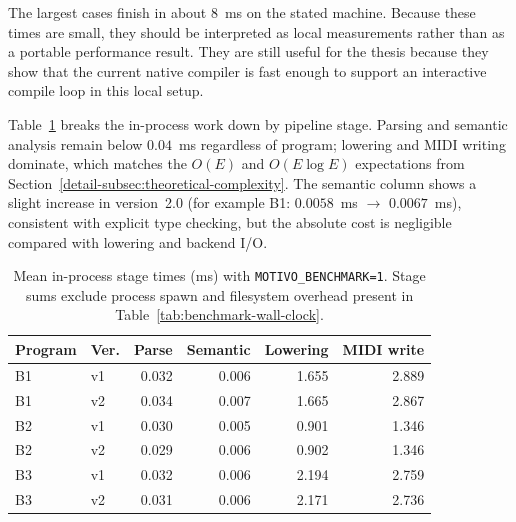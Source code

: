 The largest cases finish in about 8~ms on the stated machine.
Because these times are small, they should be interpreted as local measurements rather than as a portable performance
result.
They are still useful for the thesis because they show that the current native compiler is fast enough to support an
interactive compile loop in this local setup.

Table~\ref{tab:benchmark-per-stage} breaks the in-process work down by pipeline stage.
Parsing and semantic analysis remain below $0.04$~ms regardless of program; lowering and MIDI writing dominate, which
matches the $O(E)$ and $O(E \log E)$ expectations from Section~\ref{detail-subsec:theoretical-complexity}.
The semantic column shows a slight increase in version~2.0 (for example B1: $0.0058$~ms $\rightarrow$ $0.0067$~ms),
consistent with explicit type checking, but the absolute cost is negligible compared with lowering and backend I/O.

\begin{table}[htbp]
  \centering
  \footnotesize
  \renewcommand{\arraystretch}{1.25}
  \begin{tabular}{llrrrr}
    \toprule
    \textbf{Program} & \textbf{Ver.} & \textbf{Parse} & \textbf{Semantic} & \textbf{Lowering} & \textbf{MIDI write} \\
    \midrule
    B1 & v1 & 0.032 & 0.006 & 1.655 & 2.889 \\
    B1 & v2 & 0.034 & 0.007 & 1.665 & 2.867 \\
    \midrule
    B2 & v1 & 0.030 & 0.005 & 0.901 & 1.346 \\
    B2 & v2 & 0.029 & 0.006 & 0.902 & 1.346 \\
    \midrule
    B3 & v1 & 0.032 & 0.006 & 2.194 & 2.759 \\
    B3 & v2 & 0.031 & 0.006 & 2.171 & 2.736 \\
    \bottomrule
  \end{tabular}
  \caption{Mean in-process stage times (ms) with \texttt{MOTIVO\_BENCHMARK=1}.
  Stage sums exclude process spawn and filesystem overhead present in Table~\ref{tab:benchmark-wall-clock}.}%
  \label{tab:benchmark-per-stage}
\end{table}

